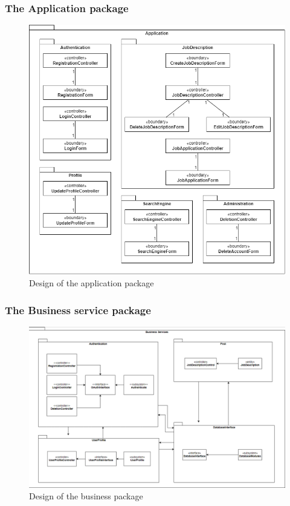 \documentclass[a4paper]{article}
\begin{document}
\subsubsection{The Application package}
\begin{figure}[H]
    \centering
    \includegraphics[width=1.0\textwidth]{application_package.drawio.png}
    \caption{Design of the application package}
    \label{fig:fig34}
\end{figure}

\subsubsection{The Business service package}
\begin{figure}[H]
    \centering
    \includegraphics[width=1.0\textwidth]{bussiness_package.png}
    \caption{Design of the business package}
    \label{fig:fig35}
\end{figure}
\end{document}
